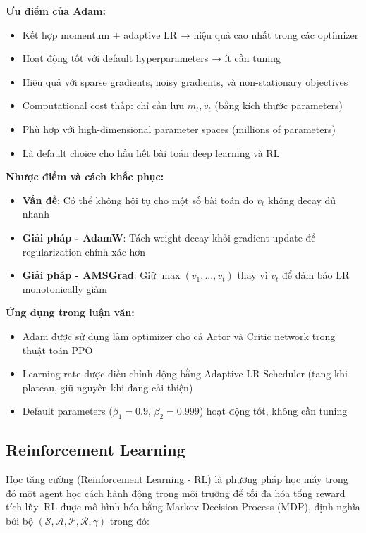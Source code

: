 \textbf{Ưu điểm của Adam:}
\begin{itemize}[nosep]
\item Kết hợp momentum + adaptive LR → hiệu quả cao nhất trong các optimizer
\item Hoạt động tốt với default hyperparameters → ít cần tuning
\item Hiệu quả với sparse gradients, noisy gradients, và non-stationary objectives
\item Computational cost thấp: chỉ cần lưu $m_t, v_t$ (bằng kích thước parameters)
\item Phù hợp với high-dimensional parameter spaces (millions of parameters)
\item Là default choice cho hầu hết bài toán deep learning và RL
\end{itemize}

\textbf{Nhược điểm và cách khắc phục:}
\begin{itemize}[nosep]
\item \textbf{Vấn đề}: Có thể không hội tụ cho một số bài toán do $v_t$ không decay đủ nhanh
\item \textbf{Giải pháp - AdamW}: Tách weight decay khỏi gradient update để regularization chính xác hơn
\item \textbf{Giải pháp - AMSGrad}: Giữ $\max(v_1, ..., v_t)$ thay vì $v_t$ để đảm bảo LR monotonically giảm
\end{itemize}

\textbf{Ứng dụng trong luận văn:}
\begin{itemize}[nosep]
\item Adam được sử dụng làm optimizer cho cả Actor và Critic network trong thuật toán PPO
\item Learning rate được điều chỉnh động bằng Adaptive LR Scheduler (tăng khi plateau, giữ nguyên khi đang cải thiện)
\item Default parameters ($\beta_1=0.9$, $\beta_2=0.999$) hoạt động tốt, không cần tuning
\end{itemize}

\subsection{Reinforcement Learning}
\label{subsec:rl_basics}

Học tăng cường (Reinforcement Learning - RL) là phương pháp học máy trong đó một agent học cách hành động trong môi trường để tối đa hóa tổng reward tích lũy. RL được mô hình hóa bằng Markov Decision Process (MDP), định nghĩa bởi bộ $(\mathcal{S}, \mathcal{A}, \mathcal{P}, \mathcal{R}, \gamma)$ trong đó:

